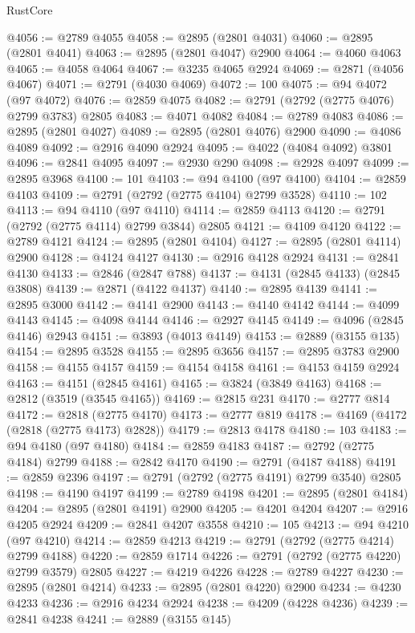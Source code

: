 \begin{lexlean}{RustCore}
\begin{coremodule}
@4056 := @2789 @4055
@4058 := @2895 (@2801 @4031)
@4060 := @2895 (@2801 @4041)
@4063 := @2895 (@2801 @4047) @2900
@4064 := @4060 @4063
@4065 := @4058 @4064
@4067 := @3235 @4065 @2924
@4069 := @2871 (@4056 @4067)
@4071 := @2791 (@4030 @4069)
@4072 := 100
@4075 := @94 @4072 (@97 @4072)
@4076 := @2859 @4075
@4082 := @2791 (@2792 (@2775 @4076) @2799 @3783) @2805
@4083 := @4071 @4082
@4084 := @2789 @4083
@4086 := @2895 (@2801 @4027)
@4089 := @2895 (@2801 @4076) @2900
@4090 := @4086 @4089
@4092 := @2916 @4090 @2924
@4095 := @4022 (@4084 @4092) @3801
@4096 := @2841 @4095
@4097 := @2930 @290
@4098 := @2928 @4097
@4099 := @2895 @3968
@4100 := 101
@4103 := @94 @4100 (@97 @4100)
@4104 := @2859 @4103
@4109 := @2791 (@2792 (@2775 @4104) @2799 @3528)
@4110 := 102
@4113 := @94 @4110 (@97 @4110)
@4114 := @2859 @4113
@4120 := @2791 (@2792 (@2775 @4114) @2799 @3844) @2805
@4121 := @4109 @4120
@4122 := @2789 @4121
@4124 := @2895 (@2801 @4104)
@4127 := @2895 (@2801 @4114) @2900
@4128 := @4124 @4127
@4130 := @2916 @4128 @2924
@4131 := @2841 @4130
@4133 := @2846 (@2847 @788)
@4137 := @4131 (@2845 @4133) (@2845 @3808)
@4139 := @2871 (@4122 @4137)
@4140 := @2895 @4139
@4141 := @2895 @3000
@4142 := @4141 @2900
@4143 := @4140 @4142
@4144 := @4099 @4143
@4145 := @4098 @4144
@4146 := @2927 @4145
@4149 := @4096 (@2845 @4146) @2943
@4151 := @3893 (@4013 @4149)
@4153 := @2889 (@3155 @135)
@4154 := @2895 @3528
@4155 := @2895 @3656
@4157 := @2895 @3783 @2900
@4158 := @4155 @4157
@4159 := @4154 @4158
@4161 := @4153 @4159 @2924
@4163 := @4151 (@2845 @4161)
@4165 := @3824 (@3849 @4163)
@4168 := @2812 (@3519 (@3545 @4165))
@4169 := @2815 @231
@4170 := @2777 @814
@4172 := @2818 (@2775 @4170)
@4173 := @2777 @819
@4178 := @4169 (@4172 (@2818 (@2775 @4173) @2828))
@4179 := @2813 @4178
@4180 := 103
@4183 := @94 @4180 (@97 @4180)
@4184 := @2859 @4183
@4187 := @2792 (@2775 @4184) @2799
@4188 := @2842 @4170
@4190 := @2791 (@4187 @4188)
@4191 := @2859 @2396
@4197 := @2791 (@2792 (@2775 @4191) @2799 @3540) @2805
@4198 := @4190 @4197
@4199 := @2789 @4198
@4201 := @2895 (@2801 @4184)
@4204 := @2895 (@2801 @4191) @2900
@4205 := @4201 @4204
@4207 := @2916 @4205 @2924
@4209 := @2841 @4207 @3558
@4210 := 105
@4213 := @94 @4210 (@97 @4210)
@4214 := @2859 @4213
@4219 := @2791 (@2792 (@2775 @4214) @2799 @4188)
@4220 := @2859 @1714
@4226 := @2791 (@2792 (@2775 @4220) @2799 @3579) @2805
@4227 := @4219 @4226
@4228 := @2789 @4227
@4230 := @2895 (@2801 @4214)
@4233 := @2895 (@2801 @4220) @2900
@4234 := @4230 @4233
@4236 := @2916 @4234 @2924
@4238 := @4209 (@4228 @4236)
@4239 := @2841 @4238
@4241 := @2889 (@3155 @145)

\end{coremodule}
\end{lexlean}
